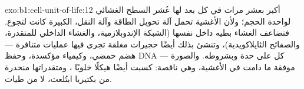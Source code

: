 \begin{solution}{exo:b1:cell-unit-of-life:12}
 أكبر بعشر مرات في كل بعد لها عُشر السطح الغشائي لواحدة الحجم؛
ولأن الأغشية تحمل آلة تحويل الطاقة وآلة النقل،  الكبيرة كانت
لتجوع. فتضاعف  الغشاء بطيه داخل نفسها (الشبكة
الإندوبلازمية، والغشاء الداخلي للمتقدرة، والصفائح الثايلاكويدية)،
وتنشئ بذلك أيضًا حجيرات مغلقة تجري فيها عمليات متنافرة --- هضم حمضي،
وكيمياء مؤكسدة، وحفظ DNA --- كل على حدة وبشروطه. والصورة موفقة ما
دامت في الأغشية، وهي ناقصة:  كسبت أيضًا هيكلًا خلويًا
، ومتقدراتها منحدرة من بكتيريا ابتُلعت، لا من طيات.
\end{solution}

